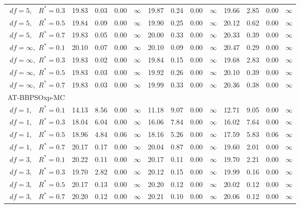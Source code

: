 \documentclass[12pt]{article}
\begin{document}
\begin{table}[ht]
{\begin{tabular}{r|rrrr|rrrr|rrrr}
  $df = 5,\enspace$ $R^* =0.3$ & 19.83 & 0.03 & 0.00 & $\infty$ & 19.87 & 0.24 & 0.00 & $\infty$ & 19.66 & 2.85 & 0.00 & $\infty$ \\ 
  $df = 5,\enspace$ $R^* =0.5$ & 19.84 & 0.09 & 0.00 & $\infty$ & 19.90 & 0.25 & 0.00 & $\infty$ & 20.12 & 0.62 & 0.00 & $\infty$ \\ 
  $df = 5,\enspace$ $R^* =0.7$ & 19.83 & 0.05 & 0.00 & $\infty$ & 20.00 & 0.33 & 0.00 & $\infty$ & 20.33 & 0.39 & 0.00 & $\infty$ \\ 
  $df = \infty,$ $R^* =0.1$ & 20.10 & 0.07 & 0.00 & $\infty$ & 20.10 & 0.09 & 0.00 & $\infty$ & 20.47 & 0.29 & 0.00 & $\infty$ \\ 
  $df = \infty,$ $R^* =0.3$ & 19.83 & 0.02 & 0.00 & $\infty$ & 19.84 & 0.15 & 0.00 & $\infty$ & 19.68 & 2.83 & 0.00 & $\infty$ \\ 
  $df = \infty,$ $R^* =0.5$ & 19.83 & 0.03 & 0.00 & $\infty$ & 19.92 & 0.26 & 0.00 & $\infty$ & 20.10 & 0.39 & 0.00 & $\infty$ \\ 
  $df = \infty,$ $R^* =0.7$ & 19.83 & 0.03 & 0.00 & $\infty$ & 19.99 & 0.33 & 0.00 & $\infty$ & 20.36 & 0.38 & 0.00 & $\infty$ \\ 
\hline
\multicolumn{1}{l|}{AT-BBPSOxp-MC} &&&&&&&&&&&&\\
  $df = 1,\enspace$ $R^* =0.1$ & 14.13 & 8.56 & 0.00 & $\infty$ & 11.18 & 9.07 & 0.00 & $\infty$ & 12.71 & 9.05 & 0.00 & $\infty$ \\ 
  $df = 1,\enspace$ $R^* =0.3$ & 18.04 & 6.04 & 0.00 & $\infty$ & 16.06 & 7.84 & 0.00 & $\infty$ & 16.02 & 7.64 & 0.00 & $\infty$ \\ 
  $df = 1,\enspace$ $R^* =0.5$ & 18.96 & 4.84 & 0.06 & $\infty$ & 18.16 & 5.26 & 0.00 & $\infty$ & 17.59 & 5.83 & 0.06 & $\infty$ \\ 
  $df = 1,\enspace$ $R^* =0.7$ & 20.17 & 0.17 & 0.00 & $\infty$ & 20.04 & 0.87 & 0.00 & $\infty$ & 19.60 & 2.01 & 0.00 & $\infty$ \\ 
  $df = 3,\enspace$ $R^* =0.1$ & 20.22 & 0.11 & 0.00 & $\infty$ & 20.17 & 0.11 & 0.00 & $\infty$ & 19.70 & 2.21 & 0.00 & $\infty$ \\ 
  $df = 3,\enspace$ $R^* =0.3$ & 19.70 & 2.82 & 0.00 & $\infty$ & 20.12 & 0.15 & 0.00 & $\infty$ & 19.99 & 0.16 & 0.00 & $\infty$ \\ 
  $df = 3,\enspace$ $R^* =0.5$ & 20.17 & 0.13 & 0.00 & $\infty$ & 20.20 & 0.12 & 0.00 & $\infty$ & 20.02 & 0.12 & 0.00 & $\infty$ \\ 
  $df = 3,\enspace$ $R^* =0.7$ & 20.20 & 0.12 & 0.00 & $\infty$ & 20.21 & 0.10 & 0.00 & $\infty$ & 20.06 & 0.12 & 0.00 & $\infty$ \\ 

\end{tabular}}
\end{table}
\end{document}

